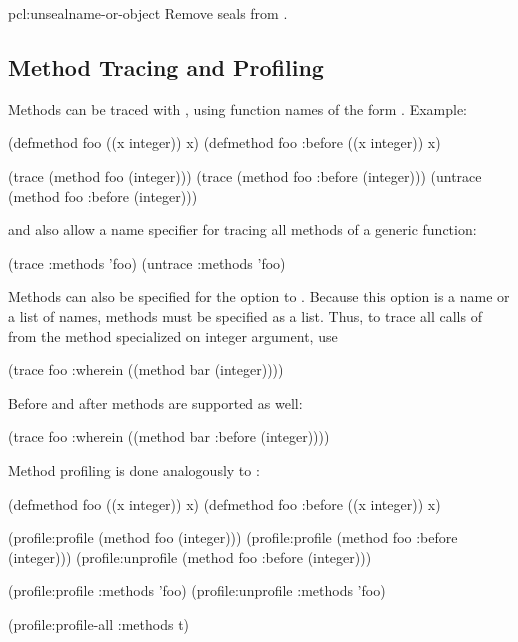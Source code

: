\begin{defun}{pcl:}{unseal}{name-or-object}
  Remove seals from .
\end{defun}



\subsection{Method Tracing and Profiling}
\label{sec:method-tracing}

Methods can be traced with , using function names of the
form .  Example:

\begin{example}
(defmethod foo ((x integer)) x)
(defmethod foo :before ((x integer)) x)

(trace (method foo (integer)))
(trace (method foo :before (integer)))
(untrace (method foo :before (integer)))
\end{example}
  
 and  also allow a name specifier
 for tracing all methods of a generic function:

\begin{example}
(trace :methods 'foo)
(untrace :methods 'foo)
\end{example}

Methods can also be specified for the  option to
.  Because this option is a name or a list of names,
methods must be specified as a list.  Thus, to trace all calls of
 from the method  specialized on integer argument,
use
\begin{example}
  (trace foo :wherein ((method bar (integer))))
\end{example}
Before and after methods are supported as well:
\begin{example}
  (trace foo :wherein ((method bar :before (integer))))
\end{example}

Method profiling is done analogously to :

\begin{example}
(defmethod foo ((x integer)) x)
(defmethod foo :before ((x integer)) x)

(profile:profile (method foo (integer)))
(profile:profile (method foo :before (integer)))
(profile:unprofile (method foo :before (integer)))

(profile:profile :methods 'foo)
(profile:unprofile :methods 'foo)

(profile:profile-all :methods t)
\end{example}



